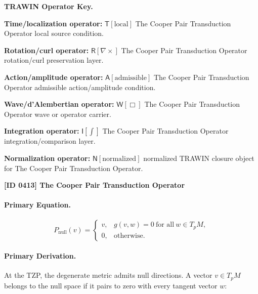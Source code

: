 \par\vspace{0.45\baselineskip}
\noindent\begin{minipage}[t]{\linewidth}
\begingroup
\small
\raggedright
\textbf{TRAWIN Operator Key.}\par
\noindent\textbf{Time/localization operator:} $\mathsf{T}\!\left[\mathrm{local}\right]$ The Cooper Pair Transduction Operator local source condition.\par
\noindent\textbf{Rotation/curl operator:} $\mathsf{R}\!\left[\nabla\times\right]$ The Cooper Pair Transduction Operator rotation/curl preservation layer.\par
\noindent\textbf{Action/amplitude operator:} $\mathsf{A}\!\left[\mathrm{admissible}\right]$ The Cooper Pair Transduction Operator admissible action/amplitude condition.\par
\noindent\textbf{Wave/d'Alembertian operator:} $\mathsf{W}\!\left[\Box\right]$ The Cooper Pair Transduction Operator wave or operator carrier.\par
\noindent\textbf{Integration operator:} $\mathsf{I}\!\left[\int\right]$ The Cooper Pair Transduction Operator integration/comparison layer.\par
\noindent\textbf{Normalization operator:} $\mathsf{N}\!\left[\mathrm{normalized}\right]$ normalized TRAWIN closure object for The Cooper Pair Transduction Operator.\par
\endgroup
\end{minipage}

\clearpage
\noindent\textbf{[ID 0413] The Cooper Pair Transduction Operator}\par
\vspace{0.35em}
\paragraph{Primary Equation.}
\begin{equation}
P_{\mathrm{null}}(v)
=
\begin{cases}
v, & g(v,w)=0\ \text{for all}\ w\in T_pM,\\
0, & \text{otherwise}.
\end{cases}
\end{equation}

\paragraph{Primary Derivation.}
At the TZP, the degenerate metric admits null directions.  
A vector $v\in T_pM$ belongs to the null space if it pairs to zero with every tangent vector $w$:

